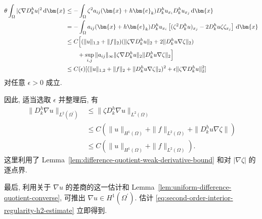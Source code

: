 \begin{Proof}
\[\begin{aligned}
\theta\int_\Omega|\zeta\nabla D_k^hu|^2\,\mathrm{d}\bm{x}
&\leq-\int_\Omega\zeta^2a_{ij}(\bm{x}+h\bm{e}_k)D_k^hu_{x_i}D_k^hu_{x_j}\,\mathrm{d}\bm{x}\\
&=-\int_\Omega a_{ij}(\bm{x}+h\bm{e}_k)D_k^hu_{x_i}\left[(\zeta^2D_k^hu)_{x_j}-2D_k^hu\zeta\zeta_{x_j}\right]\,\mathrm{d}\bm{x}\\
&\leq C\Bigl[(\|u\|_{1,2}+\|f\|_2)(\|\zeta\nabla D_k^hu\|_2+2\|D_k^hu\nabla\zeta\|_2)\\
&\qquad+\sup_{i,j}\|a_{ij}\|_\infty\|\zeta\nabla D_k^hu\|_2\|D_k^hu\nabla\zeta\|_2\Bigr]\\
&\leq C(\epsilon)[(\|u\|_{1,2}+\|f\|_2+\|D_k^hu\nabla\zeta\|_2)^2+\epsilon\|\zeta\nabla D_k^hu\|_2^2]
\end{aligned}\]对任意 $\epsilon>0$ 成立.

因此, 适当选取 $\epsilon$ 并整理后, 有\[\begin{aligned}
\|D_k^h\nabla u\|_{L^2(\Omega^{\prime})}&\leq\|\zeta D_k^h\nabla u\|_{L^2(\Omega)}\\
&\leq C(\|u\|_{H^1(\Omega)}+\|f\|_{L^2(\Omega)}+\|D_k^hu\nabla\zeta\|)\\
&\leq C(\|u\|_{H^1(\Omega)}+\|f\|_{L^2(\Omega)}).
\end{aligned}\]这里利用了 Lemma~\ref{lem:difference-quotient-weak-derivative-bound} 和对 $|\nabla\zeta|$ 的逐点界.

最后, 利用关于 $\nabla u$ 的差商的这一估计和 Lemma~\ref{lem:uniform-difference-quotient-converse}, 可推出 $\nabla u\in H^1(\Omega^{\prime})$. 估计 \eqref{eq:second-order-interior-regularity-h2-estimate} 立即得到.
\end{Proof}
\endgroup
